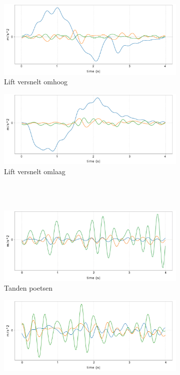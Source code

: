 \documentclass{article}
\begin{document}
\begin{figure}
  \begin{subfigure}[b]{.49\linewidth}
    \centering
    \includegraphics[width=.99\textwidth]{figures/liftau}
    \caption{Lift versnelt omhoog}\label{fig:1g}
  \end{subfigure}
  \begin{subfigure}[b]{.49\linewidth}
    \centering
    \includegraphics[width=.99\textwidth]{figures/liftad}
    \caption{Lift versnelt omlaag}\label{fig:1h}
  \end{subfigure} \\~\\
  \begin{subfigure}[b]{.49\linewidth}
    \centering
    \includegraphics[width=.99\textwidth]{figures/tandenpoetsen}
    \caption{Tanden poetsen}\label{fig:1i}
  \end{subfigure}
  \begin{subfigure}[b]{.49\linewidth}
    \centering
    \includegraphics[width=.99\textwidth]{figures/nietsdoen}

\end{subfigure}
\end{figure}
\end{document}
